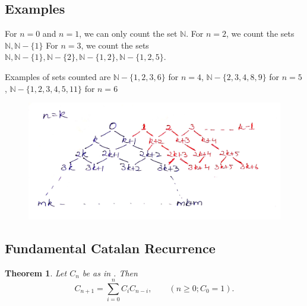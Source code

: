\documentclass[12pt,reqno]{amsart}
\newtheorem{thm}{Theorem}[section]
\theoremstyle{definition}
\begin{document}
\subsection{Examples}

For $n=0$ and $n=1$, we can only count the set $\mathbb{N}$.
For $n=2$, we count the sets \(\mathbb{N}, \mathbb{N}-\{1\}\)
For $n=3$, we count the sets \(\mathbb{N}, \mathbb{N} -\{1\}, \mathbb{N} -\{2\}, \mathbb{N} -\{1,2\}, \mathbb{N} -\{1,2,5\}\).

Examples of sets counted are $\mathbb{N} - \{1,2,3,6\}$ for $n=4$, $\mathbb{N} - \{2,3,4,8,9\}$ for $n=5$, $\mathbb{N} - \{1,2,3,4,5,11\}$ for $n=6$


\begin{figure}[h]
  \centering
  \caption{}
  \includegraphics[scale=0.15]{diag-a.png}
  \label{fig:fig1}
  \end{figure}
  
\subsection{Fundamental Catalan Recurrence}

\begin{thm}
  Let $C_n$ be as in . Then
    \[ C_{n+1} = \sum_{i=0}^n C_i C_{n-i}, \qquad (n \geq 0; C_0 = 1). \]
\end{thm}
\end{document}

